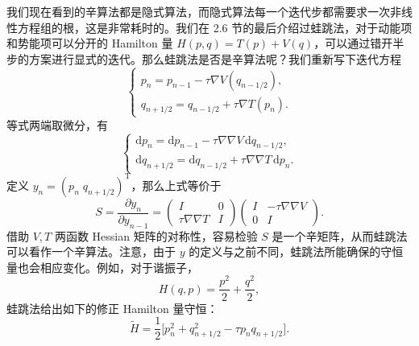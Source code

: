 我们现在看到的辛算法都是隐式算法，而隐式算法每一个迭代步都需要求一次非线性方程组的根，这是非常耗时的。我们在 2.6 节的最后介绍过蛙跳法，对于动能项和势能项可以分开的 Hamilton 量 $H(p,q)=T(p)+V(q)$，可以通过错开半步的方案进行显式的迭代。那么蛙跳法是否是辛算法呢？我们重新写下迭代方程
\begin{equation}
\begin{cases}
 p_n=p_{n-1}-\tau\nabla V(q_{n-1/2}),\\
 q_{n+1/2}=q_{n-1/2}+\tau\nabla T(p_n).
\end{cases}
\tag{4.4.23}
\end{equation}
等式两端取微分，有
\begin{equation}
\begin{cases}
 \mathrm dp_n=\mathrm dp_{n-1}-\tau\nabla\nabla V\,\mathrm dq_{n-1/2},\\
 \mathrm dq_{n+1/2}=\mathrm dq_{n-1/2}+\tau\nabla\nabla T\,\mathrm dp_n.
\end{cases}
\tag{4.4.24}
\end{equation}
定义 $y_n=(p_n\;q_{n+1/2})^{\mathrm T}$，那么上式等价于
\begin{equation}
S=\frac{\partial y_n}{\partial y_{n-1}}
=\begin{pmatrix}I&0\\ \tau\nabla\nabla T&I\end{pmatrix}
 \begin{pmatrix}I&-\tau\nabla\nabla V\\0&I\end{pmatrix}.
\tag{4.4.25}
\end{equation}
借助 $V,T$ 两函数 Hessian 矩阵的对称性，容易检验 $S$ 是一个辛矩阵，从而蛙跳法可以看作一个辛算法。注意，由于 $y$ 的定义与之前不同，蛙跳法所能确保的守恒量也会相应变化。例如，对于谐振子，
\begin{equation}
H(q,p)=\frac{p^2}{2}+\frac{q^2}{2},
\tag{4.4.26}
\end{equation}
蛙跳法给出如下的修正 Hamilton 量守恒：
\begin{equation}
\widetilde H=\frac12\bigl[p_n^2+q_{n+1/2}^2-\tau p_nq_{n+1/2}\bigr].
\tag{4.4.27}
\end{equation}


